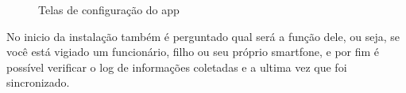\documentclass[12pt]{article}
\begin{document}
\begin{figure}[H]
\centering
{}
\quad 
{}
\caption{Telas de configuração do app}
\end{figure}

No inicio da instalação também é perguntado qual será a função dele, ou seja, se você está vigiado um funcionário, filho ou seu próprio smartfone, e por fim é possível verificar o log de informações coletadas e a ultima vez que foi sincronizado.
\end{document}
